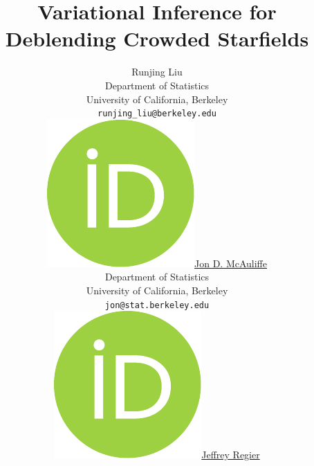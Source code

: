 \documentclass{article}
\begin{document}

\title{Variational Inference for Deblending Crowded Starfields}

\author{Runjing Liu\\
	Department of Statistics \\
	University of California, Berkeley\\
	\texttt{runjing\_liu@berkeley.edu} \\
	\And
	\href{https://orcid.org/0000-0003-2626-7320}{\includegraphics[scale=0.06]{orcid.pdf}\hspace{1mm}Jon D. McAuliffe}\\
	Department of Statistics \\
	University of California, Berkeley\\
	\texttt{jon@stat.berkeley.edu} \\
	\And
        \href{https://orcid.org/0000-0002-1472-5235}{\includegraphics[scale=0.06]{orcid.pdf}\hspace{1mm}Jeffrey Regier}\\
}
\end{document}
